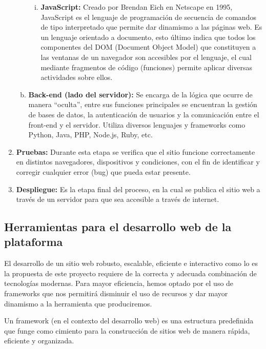 \documentclass[12pt,a4paper]{report}
\begin{document}
\begin{enumerate}
\begin{enumerate}[a.]
\begin{enumerate}[i.]
\item \textbf{JavaScript:} Creado por Brendan Eich en Netscape en 1995, JavaScript es el lenguaje de programación de secuencia de comandos de tipo interpretado que permite dar dinamismo a las páginas web. Es un lenguaje orientado a documento, esto último indica que todos los componentes del DOM (Document Object Model) que constituyen a las ventanas de un navegador son accesibles por el lenguaje, el cual mediante fragmentos de código (funciones) permite aplicar diversas actividades sobre ellos.
\end{enumerate}

\item \textbf{Back-end (lado del servidor):} Se encarga de la lógica que ocurre de manera ``oculta'', entre sus funciones principales se encuentran la gestión de bases de datos, la autenticación de usuarios y la comunicación entre el front-end y el servidor. Utiliza diversos lenguajes y frameworks como Python, Java, PHP, Node.js, Ruby, etc.
\end{enumerate}

\item \textbf{Pruebas:} Durante esta etapa se verifica que el sitio funcione correctamente en distintos navegadores, dispositivos y condiciones, con el fin de identificar y corregir cualquier error (bug) que pueda estar presente.

\item \textbf{Despliegue:} Es la etapa final del proceso, en la cual se publica el sitio web a través de un servidor para que sea accesible a través de internet.
\end{enumerate}

\subsection{Herramientas para el desarrollo web de la plataforma}

El desarrollo de un sitio web robusto, escalable, eficiente e interactivo como lo es la propuesta de este proyecto requiere de la correcta y adecuada combinación de tecnologías modernas. Para mayor eficiencia, hemos optado por el uso de frameworks que nos permitirá disminuir el uso de recursos y dar mayor dinamismo a la herramienta que produciremos.

Un framework (en el contexto del desarrollo web) es una estructura predefinida que funge como cimiento para la construcción de sitios web de manera rápida, eficiente y organizada.
\end{document}

